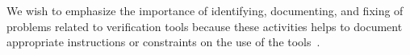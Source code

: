\FloatBarrier

We wish to emphasize the importance of identifying, documenting, and fixing of problems
related to verification tools because these activities helps to document appropriate instructions
or constraints on the use of the tools~\cite[\S~6.7.4.3]{en50128-2011}.




